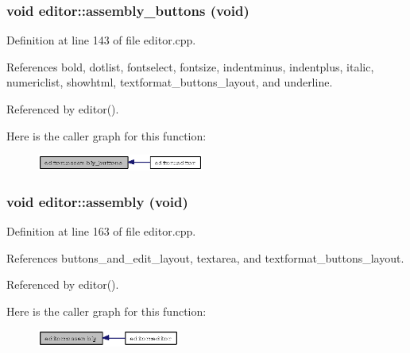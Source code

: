 \subsubsection{\setlength{\rightskip}{0pt plus 5cm}void editor::assembly\_\-buttons (void)\hspace{0.3cm}{\tt  [private]}}\label{classeditor_7081d0026bcf72ba5529fb2d29639310}




Definition at line 143 of file editor.cpp.

References bold, dotlist, fontselect, fontsize, indentminus, indentplus, italic, numericlist, showhtml, textformat\_\-buttons\_\-layout, and underline.

Referenced by editor().

Here is the caller graph for this function:\begin{figure}[H]
\begin{center}
\leavevmode
\includegraphics[width=155pt]{classeditor_7081d0026bcf72ba5529fb2d29639310_icgraph}
\end{center}
\end{figure}
\subsubsection{\setlength{\rightskip}{0pt plus 5cm}void editor::assembly (void)\hspace{0.3cm}{\tt  [private]}}\label{classeditor_a6f6ba120332d49db5f73006c8fe0d67}




Definition at line 163 of file editor.cpp.

References buttons\_\-and\_\-edit\_\-layout, textarea, and textformat\_\-buttons\_\-layout.

Referenced by editor().

Here is the caller graph for this function:\begin{figure}[H]
\begin{center}
\leavevmode
\includegraphics[width=133pt]{classeditor_a6f6ba120332d49db5f73006c8fe0d67_icgraph}
\end{center}
\end{figure}
